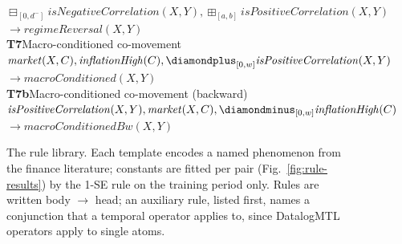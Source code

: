 \begin{figure}[t]
{\begin{minipage}{0.95\textwidth}
\hspace*{1.5em}\mbox{$\boxminus_{[0, d^{-}]}\mathit{isNegativeCorrelation}(X,Y), \boxplus_{[a,b]}\mathit{isPositiveCorrelation}(X,Y)$}\\
\hspace*{1.5em}\hspace*{3em}\mbox{$\to \mathit{regimeReversal}(X,Y)$}\\[5pt]
\textbf{T7}\quad Macro-conditioned co-movement~\cite{bekaert2013risk}\hspace{1em plus 1fill}{\footnotesize (fitted constants: $w$)}\\
\hspace*{1.5em}\mbox{$\mathit{market}(X,C), \mathit{inflationHigh}(C), \diamondplus_{[0,w]} \mathit{isPositiveCorrelation}(X,Y)$}\\
\hspace*{1.5em}\hspace*{3em}\mbox{$\to \mathit{macroConditioned}(X,Y)$}\\[5pt]
\textbf{T7b}\quad Macro-conditioned co-movement (backward)~\cite{bekaert2013risk}\hspace{1em plus 1fill}{\footnotesize (fitted constants: $w$)}\\
\hspace*{1.5em}\mbox{$\mathit{isPositiveCorrelation}(X,Y), \mathit{market}(X,C), \diamondminus_{[0,w]} \mathit{inflationHigh}(C)$}\\
\hspace*{1.5em}\hspace*{3em}\mbox{$\to \mathit{macroConditionedBw}(X,Y)$}
\end{minipage}}
\caption{The rule library. Each template encodes a named phenomenon from the finance literature; constants are fitted per pair (Fig.~\ref{fig:rule-results}) by the 1-SE rule on the training period only. Rules are written body $\to$ head; an auxiliary rule, listed first, names a conjunction that a temporal operator applies to, since DatalogMTL operators apply to single atoms.}
\label{fig:rule-library}
\end{figure}
